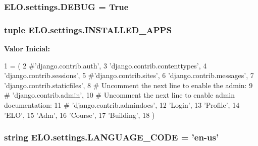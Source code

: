 \hypertarget{namespaceELO_1_1settings_a62f457ac29cc6f3e85282c71ce3b4f26}{
\subsubsection[{D\-E\-B\-U\-G}]{\setlength{\rightskip}{0pt plus 5cm}E\-L\-O.\-settings.\-D\-E\-B\-U\-G = True}}\label{namespaceELO_1_1settings_a62f457ac29cc6f3e85282c71ce3b4f26}
\hypertarget{namespaceELO_1_1settings_a1a4752075da59d93477195bcc3fc4765}{
\subsubsection[{I\-N\-S\-T\-A\-L\-L\-E\-D\-\_\-\-A\-P\-P\-S}]{\setlength{\rightskip}{0pt plus 5cm}tuple E\-L\-O.\-settings.\-I\-N\-S\-T\-A\-L\-L\-E\-D\-\_\-\-A\-P\-P\-S}}\label{namespaceELO_1_1settings_a1a4752075da59d93477195bcc3fc4765}
{\bfseries Valor Inicial\-:}
\begin{DoxyCode}
1 = (
2     \textcolor{comment}{#'django.contrib.auth',}
3     \textcolor{stringliteral}{'django.contrib.contenttypes'},
4     \textcolor{stringliteral}{'django.contrib.sessions'},
5     \textcolor{comment}{#'django.contrib.sites',}
6     \textcolor{stringliteral}{'django.contrib.messages'},
7     \textcolor{stringliteral}{'django.contrib.staticfiles'},
8     \textcolor{comment}{# Uncomment the next line to enable the admin:}
9     \textcolor{comment}{# 'django.contrib.admin',}
10     \textcolor{comment}{# Uncomment the next line to enable admin documentation:}
11     \textcolor{comment}{# 'django.contrib.admindocs',}
12     \textcolor{stringliteral}{'Login'},
13     \textcolor{stringliteral}{'Profile'},
14     \textcolor{stringliteral}{'ELO'},
15     \textcolor{stringliteral}{'Adm'},
16     \textcolor{stringliteral}{'Course'},
17     \textcolor{stringliteral}{'Building'},
18 )
\end{DoxyCode}
\hypertarget{namespaceELO_1_1settings_a388841a63bae5418e55fb741f938d4fb}{
\subsubsection[{L\-A\-N\-G\-U\-A\-G\-E\-\_\-\-C\-O\-D\-E}]{\setlength{\rightskip}{0pt plus 5cm}string E\-L\-O.\-settings.\-L\-A\-N\-G\-U\-A\-G\-E\-\_\-\-C\-O\-D\-E = 'en-\/us'}}\label{namespaceELO_1_1settings_a388841a63bae5418e55fb741f938d4fb}
